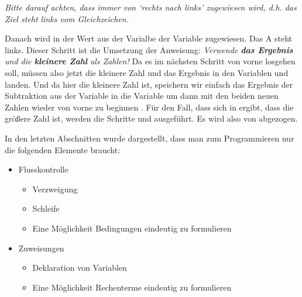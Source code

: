 \emph{Bitte darauf achten, dass immer von ‘rechts nach links’ zugewiesen wird, d.h. das Ziel steht links vom Gleichzeichen.}

Danach wird in  der Wert aus der Varialbe  der Variable  zugewiesen. Das A steht links. 
Dieser Schritt ist die Umsetzung der Anweisung: \textit{Verwende \textbf{das Ergebnis} und die \textbf{kleinere Zahl} als Zahlen!} 
Da es im nächsten Schritt von vorne losgehen soll, müssen also jetzt die kleinere Zahl und das Ergebnis in den Variablen  und 
 landen. Und da  hier die kleinere Zahl ist, speichern wir einfach das Ergebnis der Subtraktion aus der Variable 
in die Variable  um dann mit den beiden neuen Zahlen wieder von vorne zu beginnen .
Für den Fall, dass sich in  ergibt, dass  die größere Zahl ist, werden die Schritte  und  ausgeführt. 
Es wird also  von  abgezogen.


\vfill\null\pagebreak
{}
In den letzten Abschnitten wurde dargestellt, dass man zum Programmieren nur die folgenden Elemente braucht:
\begin{itemize}
  \item Flusskontrolle
  \begin{itemize}
    \item Verzweigung
    \item Schleife  
    \item Eine Möglichkeit Bedingungen eindeutig zu formulieren
	\end{itemize}
	\item Zuweisungen
  \begin{itemize}
	  \item Deklaration von Variablen
    \item Eine Möglichkeit Rechenterme eindeutig zu formulieren
	\end{itemize}
\end{itemize}


